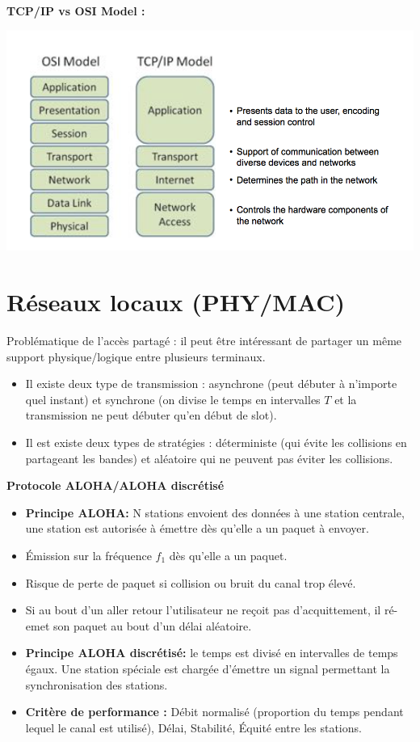 \documentclass[a4paper,9pt, twocolumn]{article}
\begin{document}
	\textbf{TCP/IP vs OSI Model :}
	\begin{center}
		\includegraphics[scale=0.4]{TCP.png}
	\end{center}


\section*{Réseaux locaux (PHY/MAC)}

	Problématique de l'accès partagé : il peut être intéressant de partager un même support physique/logique entre plusieurs terminaux. 
	\begin{itemize}
		\item Il existe deux type de transmission : asynchrone (peut débuter à n'importe quel instant) et synchrone (on divise le temps en intervalles $T$ et la transmission ne peut débuter qu'en début de slot).
		\item Il est existe deux types de stratégies : déterministe (qui évite les collisions en partageant les bandes) et aléatoire qui ne peuvent pas éviter les collisions.
	\end{itemize}
	
	\textbf{Protocole ALOHA/ALOHA discrétisé}
	\begin{itemize}
		\item \textbf{Principe ALOHA:} N stations envoient des données à une station centrale, une station est autorisée à émettre dès qu'elle a un paquet à envoyer.
		\item Émission sur la fréquence $f_{1}$ dès qu'elle a un paquet.
		\item Risque de perte de paquet si collision ou bruit du canal trop élevé.
		\item Si au bout d'un aller retour l'utilisateur ne reçoit pas d'acquittement, il ré-emet son paquet au bout d'un délai aléatoire.
		\item \textbf{Principe ALOHA discrétisé: } le temps est divisé en intervalles de temps égaux. Une station spéciale est chargée d'émettre un signal permettant la synchronisation des stations.
		\item \textbf{Critère de performance :} Débit normalisé (proportion du temps pendant lequel le canal est utilisé), Délai, Stabilité, Équité entre les stations.
	\end{itemize}
\end{document}
